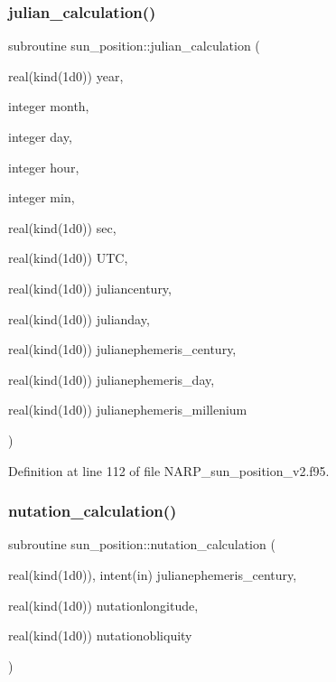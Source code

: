 \subsubsection{\texorpdfstring{julian\+\_\+calculation()}{julian\_calculation()}}
{\footnotesize\ttfamily subroutine sun\+\_\+position\+::julian\+\_\+calculation (\begin{DoxyParamCaption}\item[{real(kind(1d0))}]{year,  }\item[{integer}]{month,  }\item[{integer}]{day,  }\item[{integer}]{hour,  }\item[{integer}]{min,  }\item[{real(kind(1d0))}]{sec,  }\item[{real(kind(1d0))}]{U\+TC,  }\item[{real(kind(1d0))}]{juliancentury,  }\item[{real(kind(1d0))}]{julianday,  }\item[{real(kind(1d0))}]{julianephemeris\+\_\+century,  }\item[{real(kind(1d0))}]{julianephemeris\+\_\+day,  }\item[{real(kind(1d0))}]{julianephemeris\+\_\+millenium }\end{DoxyParamCaption})}



Definition at line 112 of file N\+A\+R\+P\+\_\+sun\+\_\+position\+\_\+v2.\+f95.

\mbox{\label{_n_a_r_p__sun__position__v2_8f95_afd4a13d3b6e58ce419603face1516751}} 
\subsubsection{\texorpdfstring{nutation\+\_\+calculation()}{nutation\_calculation()}}
{\footnotesize\ttfamily subroutine sun\+\_\+position\+::nutation\+\_\+calculation (\begin{DoxyParamCaption}\item[{real(kind(1d0)), intent(in)}]{julianephemeris\+\_\+century,  }\item[{real(kind(1d0))}]{nutationlongitude,  }\item[{real(kind(1d0))}]{nutationobliquity }\end{DoxyParamCaption})}



